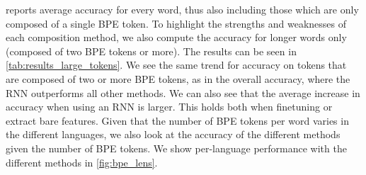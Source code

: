 \documentclass[11pt]{article}
\begin{document}
         reports average accuracy for every word,
    thus also including those which are only composed of a single BPE
    token. To highlight the strengths and weaknesses of each
    composition method, we also compute the accuracy for longer words only 
    (composed of two BPE tokens or more). The results can be seen in
    \cref{tab:results_large_tokens}.
            We see the same trend for accuracy on tokens that are
     composed of two or more BPE tokens, as in the overall accuracy,
     where the RNN outperforms all other methods. We
     can also see that the average increase in accuracy when using an
     RNN is larger. This holds both when finetuning or extract bare features.
        Given that the number of BPE tokens per word varies in the
     different languages, we also look at the accuracy of the
     different methods given the number of BPE tokens. We show
     per-language performance with the different methods in
     \cref{fig:bpe_lens}.
    
\end{document}
